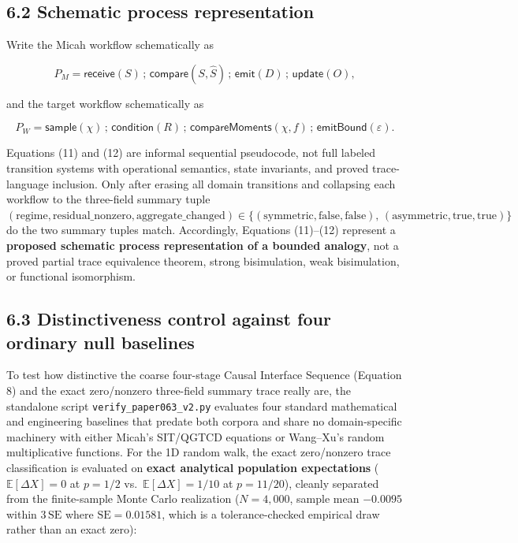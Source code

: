 \documentclass[
  american,
  11pt,
  letterpaper,
]{article}
\begin{document}
\subsection{6.2 Schematic process representation}\label{schematic-process-representation}

Write the Micah workflow schematically as

\begin{equation}
P_M = \textsf{receive}(S)\,;\,\textsf{compare}(S,\widehat S)\,;\,
\textsf{emit}(D)\,;\,\textsf{update}(O),
\tag{11}
\end{equation}

and the target workflow schematically as

\begin{equation}
P_W = \textsf{sample}(\chi)\,;\,\textsf{condition}(R)\,;\,
\textsf{compareMoments}(\chi,f)\,;\,\textsf{emitBound}(\varepsilon).
\tag{12}
\end{equation}

Equations (11) and (12) are informal sequential pseudocode, not full labeled transition systems with operational semantics, state invariants, and proved trace-language inclusion. Only after erasing all domain transitions and collapsing each workflow to the three-field summary tuple \((\text{regime}, \text{residual\_nonzero}, \text{aggregate\_changed}) \in \{(\text{symmetric}, \text{false}, \text{false}),\, (\text{asymmetric}, \text{true}, \text{true})\}\) do the two summary tuples match. Accordingly, Equations (11)--(12) represent a \textbf{proposed schematic process representation of a bounded analogy}, not a proved partial trace equivalence theorem, strong bisimulation, weak bisimulation, or functional isomorphism.

\subsection{6.3 Distinctiveness control against four ordinary null baselines}\label{distinctiveness-control-against-four-ordinary-null-baselines}

To test how distinctive the coarse four-stage Causal Interface Sequence (Equation 8) and the exact zero/nonzero three-field summary trace really are, the standalone script \nolinkurl{verify_paper063_v2.py} evaluates four standard mathematical and engineering baselines that predate both corpora and share no domain-specific machinery with either Micah's SIT/QGTCD equations or Wang--Xu's random multiplicative functions. For the 1D random walk, the exact zero/nonzero trace classification is evaluated on \textbf{exact analytical population expectations} (\(\mathbb{E}[\Delta X] = 0\) at \(p = 1/2\) vs.~\(\mathbb{E}[\Delta X] = 1/10\) at \(p = 11/20\)), cleanly separated from the finite-sample Monte Carlo realization (\(N = 4{,}000\), sample mean \(-0.0095\) within \(3\,\mathrm{SE}\) where \(\mathrm{SE} = 0.01581\), which is a tolerance-checked empirical draw rather than an exact zero):
\end{document}
